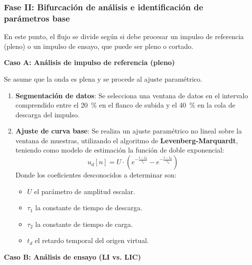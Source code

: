 \subsubsection{Fase II: Bifurcación de análisis e identificación de parámetros base}

En este punto, el flujo se divide según si debe procesar un impulso de referencia (pleno) o un impulso de ensayo, que puede ser pleno o cortado.

\textbf{Caso A: Análisis de impulso de referencia (pleno)}

Se asume que la onda es plena y se procede al ajuste paramétrico.
\begin{enumerate}[resume]
    \item \textbf{Segmentación de datos}: Se selecciona una ventana de datos en el intervalo comprendido entre el \qty{20}{\percent} en el flanco de subida y el \qty{40}{\percent} en la cola de descarga del impulso.
    \item \textbf{Ajuste de curva base}: Se realiza un ajuste paramétrico no lineal sobre la ventana de muestras, utilizando el algoritmo de \textbf{Levenberg-Marquardt}, teniendo como modelo de estimación la función de doble exponencial:
    \begin{equation}
        \label{eq:modelo_doble_exponencial}
        u_d[n] = U \cdot \left( e^{-\frac{t - t_d}{\tau_1}} - e^{-\frac{t - t_d}{\tau_2}} \right)
    \end{equation}
    Donde los coeficientes desconocidos a determinar son:
    \begin{itemize}
        \item $U$ el parámetro de amplitud escalar.
        \item $\tau_1$ la constante de tiempo de descarga.
        \item $\tau_2$ la constante de tiempo de carga.
        \item $t_d$ el retardo temporal del origen virtual.
    \end{itemize}
\end{enumerate}

\textbf{Caso B: Análisis de ensayo (LI vs. LIC)}

